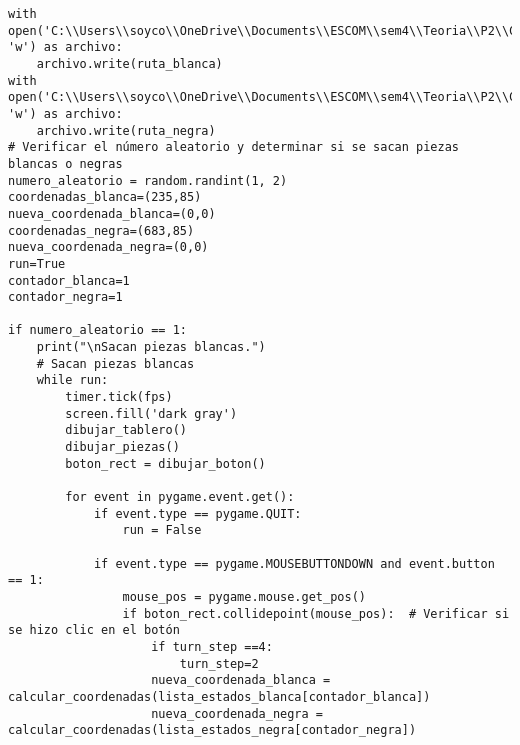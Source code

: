 \begin{lstlisting}
with open('C:\\Users\\soyco\\OneDrive\\Documents\\ESCOM\\sem4\\Teoria\\P2\\Chess\\output\\ruta_blanca.txt', 'w') as archivo:
    archivo.write(ruta_blanca)
with open('C:\\Users\\soyco\\OneDrive\\Documents\\ESCOM\\sem4\\Teoria\\P2\\Chess\\output\\ruta_negra.txt', 'w') as archivo:
    archivo.write(ruta_negra)
# Verificar el número aleatorio y determinar si se sacan piezas blancas o negras
numero_aleatorio = random.randint(1, 2)
coordenadas_blanca=(235,85)
nueva_coordenada_blanca=(0,0)
coordenadas_negra=(683,85)
nueva_coordenada_negra=(0,0)
run=True
contador_blanca=1
contador_negra=1

if numero_aleatorio == 1:
    print("\nSacan piezas blancas.")
    # Sacan piezas blancas
    while run:
        timer.tick(fps)
        screen.fill('dark gray')
        dibujar_tablero()
        dibujar_piezas()
        boton_rect = dibujar_boton()

        for event in pygame.event.get():
            if event.type == pygame.QUIT:
                run = False

            if event.type == pygame.MOUSEBUTTONDOWN and event.button == 1:
                mouse_pos = pygame.mouse.get_pos()
                if boton_rect.collidepoint(mouse_pos):  # Verificar si se hizo clic en el botón
                    if turn_step ==4:
                        turn_step=2
                    nueva_coordenada_blanca = calcular_coordenadas(lista_estados_blanca[contador_blanca])
                    nueva_coordenada_negra = calcular_coordenadas(lista_estados_negra[contador_negra])
                    

\end{lstlisting}
